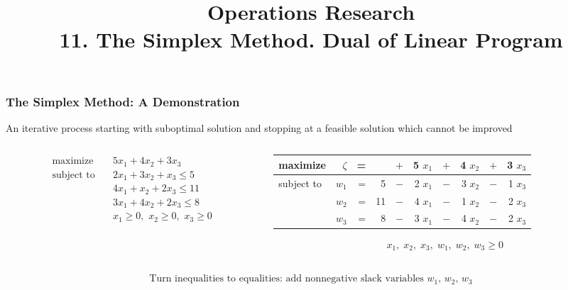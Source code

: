 \documentclass[usenames,dvipsnames,8pt]{beamer}%
\title{Operations Research\\ 11. The Simplex Method. Dual of Linear Program}
\author{}%
\date{}
\begin{document}
\begin{frame}
  \titlepage
\end{frame}

\begin{frame}
  \frametitle{The Simplex Method: A Demonstration}
  \begin{center}
    {\color{C2}An iterative process starting with suboptimal solution and stopping at a feasible solution which cannot be improved} 
  \end{center}
  \begin{columns}
    \begin{column}{0.5\textwidth}
      \begin{align*}
        \text{maximize}\quad    &5 x_1 + 4 x_2 + 3 x_3 \\
        \text{subject to}\quad  &2 x_1 + 3 x_2 + x_3 \leqslant 5 \\
                                &4 x_1 + x_2 + 2 x_3 \leqslant 11 \\
                                &3 x_1 + 4 x_2 + 2 x_3 \leqslant 8 \\
                                &x_1\geqslant 0,\,\,x_2\geqslant 0,\,\,x_3\geqslant 0
      \end{align*}
    \end{column}
    \begin{column}{0.5\textwidth}
      \begin{table}[ht]
        \centering
        \setlength\tabcolsep{2pt}
        \begin{tabular}{lrrrcrcrcr}
          \toprule
          maximize   &$\zeta$& = &   & $+$ & 5 $x_1$ & $+$ & 4 $x_2$ & $+$ & 3 $x_3$ \\
          \midrule
          subject to & $w_1$ & = & 5 & $-$ & 2 $x_1$ & $-$ & 3 $x_2$ & $-$ & 1 $x_3$ \\
                     & $w_2$ & = &11 & $-$ & 4 $x_1$ & $-$ & 1 $x_2$ & $-$ & 2 $x_3$ \\
                     & $w_3$ & = & 8 & $-$ & 3 $x_1$ & $-$ & 4 $x_2$ & $-$ & 2 $x_3$ \\ 
          \bottomrule
        \end{tabular}
      \end{table}
      \vspace{-0.4cm}
      \begin{align*}
        x_1,\;x_2,\;x_3,\;w_1,\;w_2,\;w_3\geqslant 0
      \end{align*}
    \end{column}
  \end{columns}
  \vspace{0.5cm}
  \begin{align*}
    \text{Turn inequalities to equalities: add nonnegative slack variables $w_1$, $w_2$, $w_3$} \\
  \end{align*}
\end{frame}
\end{document}
